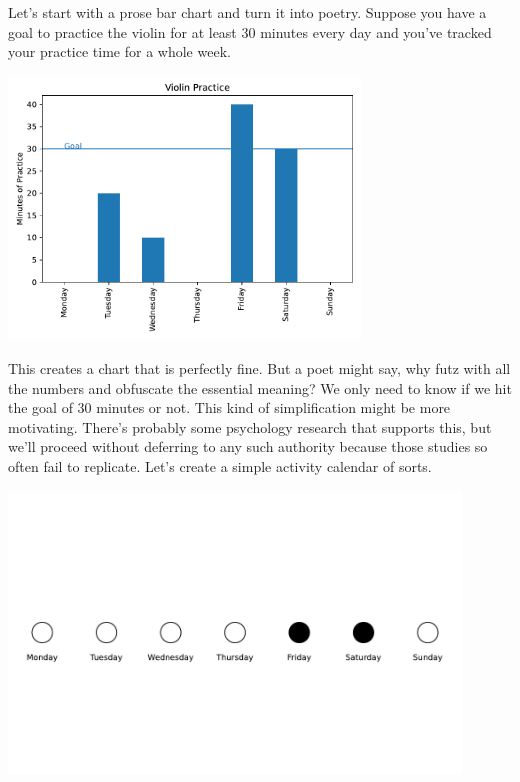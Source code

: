 Let's start with a prose bar chart and turn it into poetry. Suppose you have a goal to practice the violin for at least 30 minutes every day and you've tracked your practice time for a whole week. 


 \begin{center}
     \includegraphics[width = 0.7\textwidth]{figures/poetryplots/violin-bar.pdf}
 \end{center}

This creates a chart that is perfectly fine. But a poet might say, why futz with all the numbers and obfuscate the essential meaning? We only need to know if we hit the goal of 30 minutes or not. This kind of simplification might be more motivating. There's probably some psychology research that supports this, but we'll proceed without deferring to any such authority because those studies so often fail to replicate. Let's create a simple activity calendar of sorts.



 \begin{center}
     \includegraphics[width = 0.9\textwidth]{figures/poetryplots/violin-cal.pdf}
 \end{center}
 

